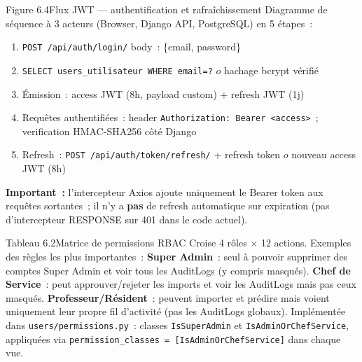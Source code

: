 \documentclass[12pt,a4paper]{article}
\begin{document}
\begin{figbox}{Figure 6.4}{Flux JWT --- authentification et rafraîchissement}
Diagramme de séquence à 3 acteurs (Browser, Django API, PostgreSQL) en 5 étapes~:
\begin{enumerate}[leftmargin=2em, itemsep=1pt]
  \item \texttt{POST /api/auth/login/} body~: \{email, password\}
  \item \texttt{SELECT users\_utilisateur WHERE email=?} $	o$ hachage bcrypt vérifié
  \item Émission~: access JWT (8h, payload custom) + refresh JWT (1j)
  \item Requêtes authentifiées~: header \texttt{Authorization: Bearer <access>}~;
    verification HMAC-SHA256 côté Django
  \item Refresh~: \texttt{POST /api/auth/token/refresh/} + refresh token
    $	o$ nouveau access JWT (8h)
\end{enumerate}
\textbf{Important~:} l'intercepteur Axios ajoute uniquement le Bearer token
aux requêtes sortantes~; il n'y a \textbf{pas} de refresh automatique sur
expiration (pas d'intercepteur RESPONSE sur 401 dans le code actuel).
\end{figbox}

\begin{figbox}{Tableau 6.2}{Matrice de permissions RBAC}
Croise 4 rôles $\times$ 12 actions. Exemples des règles les plus importantes~:
\textbf{Super Admin}~: seul à pouvoir supprimer des comptes Super Admin et voir
tous les AuditLogs (y compris masqués). \textbf{Chef de Service}~: peut approuver/rejeter
les imports et voir les AuditLogs mais pas ceux masqués.
\textbf{Professeur/Résident}~: peuvent importer et prédire mais voient uniquement
leur propre fil d'activité (pas les AuditLogs globaux). Implémentée dans
\texttt{users/permissions.py}~: classes \texttt{IsSuperAdmin} et
\texttt{IsAdminOrChefService}, appliquées via
\texttt{permission\_classes = [IsAdminOrChefService]} dans chaque vue.
\end{figbox}
\end{document}
